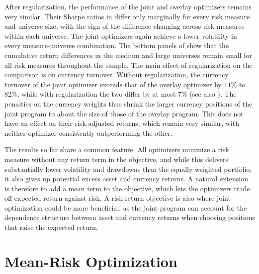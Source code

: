 After regularization, the performance of the joint and overlay optimizers remains very similar. Their Sharpe ratios in
 differ only marginally for every risk measure
and universe size, with the sign of the difference changing across risk measures within each universe. The joint optimizers again
achieve a lower volatility in every measure-universe combination. The bottom panels of
 show that the cumulative return differences in the medium and large
universes remain small for all risk measures throughout the sample. The main effect of regularization on the comparison is on currency
turnover. Without regularization, the currency turnover of the joint optimizer exceeds that of the overlay optimizer by $11\%$ to $82\%$, while with
regularization the two differ by at most $7\%$ (see also ). The penalties on the currency weights thus shrink the larger currency
positions of the joint program to about the size of those of the overlay program. This does not have an effect on their
risk-adjusted returns, which remain very similar, with neither optimizer consistently outperforming the other. 

The results so far share a common feature. All optimizers minimize a risk measure without any return term in the
objective, and while this delivers substantially lower volatility and drawdowns than the equally weighted portfolio, it
also gives up potential excess asset and currency returns. A natural extension is therefore to
add a mean term to the objective, which lets the optimizers trade off expected return against risk. 
A risk-return objective is also where joint optimization could be more beneficial, as the joint program
can account for the dependence structure between asset and currency returns when choosing positions that raise the expected
return.

\newpage
\section{Mean-Risk Optimization} \label{sec:effects-of-adding-a-mean-term}

